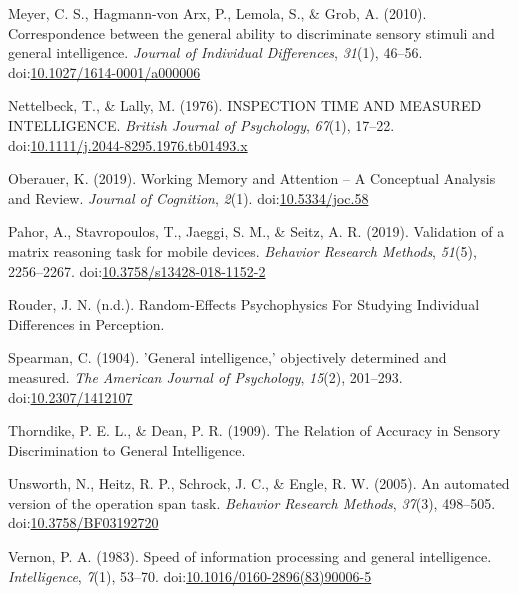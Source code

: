 \documentclass[
  ,man]{apa6}
\newlength{\cslhangindent}
\newenvironment{CSLReferences}[2] %
 {\begin{list}{}{%
  \setlength{\itemindent}{0pt}
  \setlength{\leftmargin}{0pt}
  \setlength{\parsep}{0pt}
  \ifodd #1
   \setlength{\leftmargin}{\cslhangindent}
   \setlength{\itemindent}{-1\cslhangindent}
  \fi
  \setlength{\itemsep}{#2\baselineskip}}}
 {\end{list}}
\begin{document}
\begin{CSLReferences}{1}{0}
Meyer, C. S., Hagmann-von Arx, P., Lemola, S., \& Grob, A. (2010). Correspondence between the general ability to discriminate sensory stimuli and general intelligence. \emph{Journal of Individual Differences}, \emph{31}(1), 46--56. doi:\href{https://doi.org/10.1027/1614-0001/a000006}{10.1027/1614-0001/a000006}

Nettelbeck, T., \& Lally, M. (1976). {INSPECTION TIME AND MEASURED INTELLIGENCE}. \emph{British Journal of Psychology}, \emph{67}(1), 17--22. doi:\href{https://doi.org/10.1111/j.2044-8295.1976.tb01493.x}{10.1111/j.2044-8295.1976.tb01493.x}

Oberauer, K. (2019). Working {Memory} and {Attention} -- {A Conceptual Analysis} and {Review}. \emph{Journal of Cognition}, \emph{2}(1). doi:\href{https://doi.org/10.5334/joc.58}{10.5334/joc.58}

Pahor, A., Stavropoulos, T., Jaeggi, S. M., \& Seitz, A. R. (2019). Validation of a matrix reasoning task for mobile devices. \emph{Behavior Research Methods}, \emph{51}(5), 2256--2267. doi:\href{https://doi.org/10.3758/s13428-018-1152-2}{10.3758/s13428-018-1152-2}

Rouder, J. N. (n.d.). Random-{Effects Psychophysics For Studying Individual Differences} in {Perception}.

Spearman, C. (1904). '{General} intelligence,' objectively determined and measured. \emph{The American Journal of Psychology}, \emph{15}(2), 201--293. doi:\href{https://doi.org/10.2307/1412107}{10.2307/1412107}

Thorndike, P. E. L., \& Dean, P. R. (1909). The {Relation} of {Accuracy} in {Sensory Discrimination} to {General Intelligence}.

Unsworth, N., Heitz, R. P., Schrock, J. C., \& Engle, R. W. (2005). An automated version of the operation span task. \emph{Behavior Research Methods}, \emph{37}(3), 498--505. doi:\href{https://doi.org/10.3758/BF03192720}{10.3758/BF03192720}

Vernon, P. A. (1983). Speed of information processing and general intelligence. \emph{Intelligence}, \emph{7}(1), 53--70. doi:\href{https://doi.org/10.1016/0160-2896(83)90006-5}{10.1016/0160-2896(83)90006-5}


\end{CSLReferences}
\end{document}
